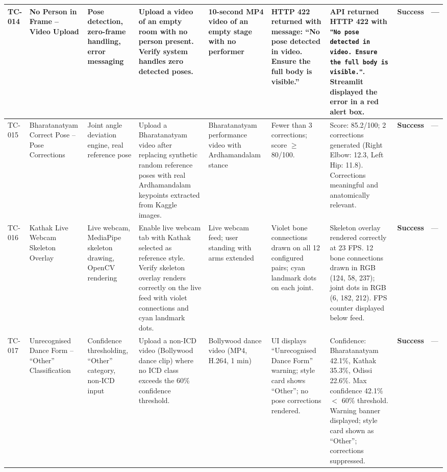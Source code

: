 \documentclass[12pt,a4paper]{article}
\begin{document}
\begin{longtable}{|P{0.6cm}|P{2.2cm}|P{2.2cm}|P{2.8cm}|P{2.4cm}|P{3.0cm}|P{3.0cm}|P{1.1cm}|P{2.4cm}|}
TC-014 &
No Person in Frame -- Video Upload &
Pose detection, zero-frame handling, error messaging &
Upload a video of an empty room with no person present. Verify system handles zero detected poses. &
10-second MP4 video of an empty stage with no performer &
HTTP 422 returned with message: ``No pose detected in video. Ensure the full body is visible.'' &
API returned HTTP 422 with \texttt{"No pose detected in video. Ensure the full body is visible."}. Streamlit displayed the error in a red alert box. &
\textbf{Success} &
--- \\
\hline

TC-015 &
Bharatanatyam Correct Pose -- Pose Corrections &
Joint angle deviation engine, real reference pose &
Upload a Bharatanatyam video after replacing synthetic random reference poses with real Ardhamandalam keypoints extracted from Kaggle images. &
Bharatanatyam performance video with Ardhamandalam stance &
Fewer than 3 corrections; score $\geq$ 80/100. &
Score: 85.2/100; 2 corrections generated (Right Elbow: 12.3\degree{}, Left Hip: 11.8\degree{}). Corrections meaningful and anatomically relevant. &
\textbf{Success} &
--- \\
\hline

TC-016 &
Kathak Live Webcam Skeleton Overlay &
Live webcam, MediaPipe skeleton drawing, OpenCV rendering &
Enable live webcam tab with Kathak selected as reference style. Verify skeleton overlay renders correctly on the live feed with violet connections and cyan landmark dots. &
Live webcam feed; user standing with arms extended &
Violet bone connections drawn on all 12 configured pairs; cyan landmark dots on each joint. &
Skeleton overlay rendered correctly at 23 FPS. 12 bone connections drawn in RGB (124, 58, 237); joint dots in RGB (6, 182, 212). FPS counter displayed below feed. &
\textbf{Success} &
--- \\
\hline

TC-017 &
Unrecognised Dance Form -- ``Other'' Classification &
Confidence thresholding, ``Other'' category, non-ICD input &
Upload a non-ICD video (Bollywood dance clip) where no ICD class exceeds the 60\% confidence threshold. &
Bollywood dance video (MP4, H.264, 1 min) &
UI displays ``Unrecognised Dance Form'' warning; style card shows ``Other''; no pose corrections rendered. &
Confidence: Bharatanatyam 42.1\%, Kathak 35.3\%, Odissi 22.6\%. Max confidence 42.1\% $<$ 60\% threshold. Warning banner displayed; style card shown as ``Other''; corrections suppressed. &
\textbf{Success} &
--- \\
\hline


\end{longtable}
\end{document}
